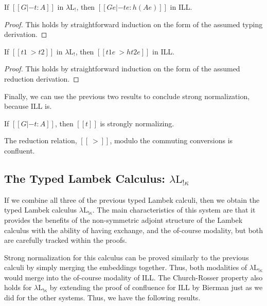\documentclass{llncs}
\begin{document}
\begin{lemma}
  \label{lemma:type_preserving_embedding_lambdaLk}
  If $[[G |- t : A]]$ in $\lambda\text{L}_!$, then
  $[[G e |- t e : h(A e)]]$ in ILL.
\end{lemma}
\begin{proof}
  This holds by straightforward induction on the form of the assumed
  typing derivation.
\end{proof}
\begin{lemma}
  \label{lemma:reduction_preserving_embedding_lambdaLk}
  If $[[t1 ~> t2]]$ in $\lambda\text{L}_!$, then $[[t1 e ~> h{t2 e}]]$
  in ILL.
\end{lemma}
\begin{proof}
  This holds by straightforward induction on the form of the assumed
  reduction derivation.
\end{proof}
\noindent
Finally, we can use the previous two results to conclude strong
normalization, because ILL is.

\begin{theorem}
  \label{corollary:strong_normalization_lambdaLk}
  If $[[G |- t : A]]$, then $[[t]]$ is strongly normalizing.
\end{theorem}

\begin{theorem}[Confluence]
  \label{thm:confluence-lambdaLk}
  The reduction relation, $[[~>]]$, modulo the commuting conversions
  is confluent.
\end{theorem}

\subsection{The Typed Lambek Calculus: $\lambda\text{L}_{!\kappa}$}
\label{subsec:the_typed_lambek_calculus:lambda-l-!kappa}
If we combine all three of the previous typed Lambek calculi, then we
obtain the typed Lambek calculus $\lambda\text{L}_{!\kappa}$.  The
main characteristics of this system are that it provides the benefits
of the non-symmetric adjoint structure of the Lambek calculus with the
ability of having exchange, and the of-course modality, but both are
carefully tracked within the proofs.

Strong normalization for this calculus can be proved similarly to the
previous calculi by simply merging the embeddings together.  Thus,
both modalities of $\lambda\text{L}_{!\kappa}$ would merge into the
of-course modality of ILL.  The Church-Rosser property also holds for
$\lambda\text{L}_{!\kappa}$ by extending the proof of confluence for
ILL by Bierman \cite{Bierman:1994} just as we did for the other
systems.  Thus, we have the following results.
\end{document}
